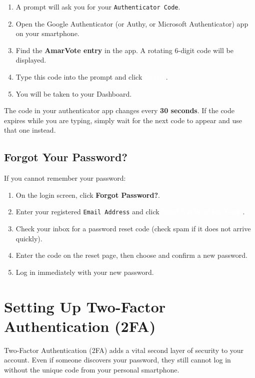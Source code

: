 \documentclass[12pt,a4paper,openany]{book}
\newcommand{\uibutton}[1]{\colorbox{primaryblue}{\textcolor{white}{\small\textbf{#1}}}}
\newcommand{\uifield}[1]{\texttt{\color{accentteal}#1}}
\newcommand{\uimenu}[1]{\textbf{\color{primaryblue}#1}}
\begin{document}
\begin{enumerate}
	\item A prompt will ask you for your \uifield{Authenticator Code}.
	\item Open the Google Authenticator (or Authy, or Microsoft Authenticator) app on your smartphone.
	\item Find the \textbf{AmarVote entry} in the app. A rotating 6-digit code will be displayed.
	\item Type this code into the prompt and click \uibutton{Verify}.
	\item You will be taken to your Dashboard.
\end{enumerate}

\begin{tcolorbox}[notebox]
	The code in your authenticator app changes every \textbf{30 seconds}. If the code expires while you are typing, simply wait for the next code to appear and use that one instead.
\end{tcolorbox}

\section{Forgot Your Password?}

If you cannot remember your password:

\begin{enumerate}
	\item On the login screen, click \uimenu{Forgot Password?}.
	\item Enter your registered \uifield{Email Address} and click \uibutton{Send Verification Code}.
	\item Check your inbox for a password reset code (check spam if it does not arrive quickly).
	\item Enter the code on the reset page, then choose and confirm a new password.
	\item Log in immediately with your new password.
\end{enumerate}

\chapter{Setting Up Two-Factor Authentication (2FA)}
\label{ch:2fa}

Two-Factor Authentication (2FA) adds a vital second layer of security to your account. Even if someone discovers your password, they still cannot log in without the unique code from your personal smartphone.
\end{document}
